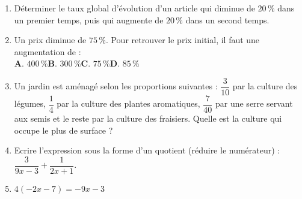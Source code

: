\documentclass[a4paper,11pt]{article}
\begin{document}
\begin{seance}{} %
\begin{enumerate}
\item Déterminer le taux global d'évolution d'un article qui diminue de
  $20\,\%$  dans un premier temps, puis qui augmente de $20\,\%$ dans un second temps.  \dotfill

\item Un prix diminue de $75\,\%$. Pour retrouver le prix initial, il faut une augmentation de : \\
    	\textbf{A}. $400\,\%$\qquad \textbf{B}. $300\,\%$\qquad \textbf{C}. $75\,\%$\qquad \textbf{D}. $85\,\%$\qquad 

\item Un jardin est aménagé selon les proportions suivantes :  $\dfrac{3}{10}$ par la culture des légumes, $\dfrac{1}{4}$ par  la culture des plantes aromatiques, $\dfrac{7}{40}$ par  une serre servant aux semis et le reste par la culture des fraisiers.  Quelle est la culture qui occupe le plus de surface ?

\dotfill 

\dotfill 


\item Ecrire l'expression sous la forme d'un quotient (réduire le numérateur) : $\dfrac{3}{9x-3}+\dfrac{1}{2x+1}$. 

\dotfill

\dotfill

\item  $4(-2x-7)=-9x-3$

\dotfill

\dotfill
\end{enumerate}

\end{seance} %
\end{document}
